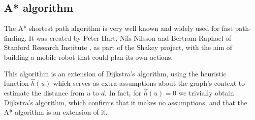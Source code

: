 \subsection{A* algorithm} \label{algorithm-shortestpath-astar}
The A* shortest path algorithm is very well known and widely used for fast path-finding. It was created by Peter Hart, Nils Nilsson and Bertram Raphael of Stanford Research Institute \cite{Astar}, as part of the Shakey project, with the aim of building a mobile robot that could plan its own actions.\par
This algorithm is an extension of Dijkstra's algorithm, using the heuristic function $\hat{h}(u)$ which serves as extra assumptions about the graph's context to estimate the distance from $u$ to $d$. In fact, for $\hat{h}(u) = 0$ we trivially obtain Dijkstra's algorithm, which confirms that it makes no assumptions, and that the A* algorithm is an extension of it.
